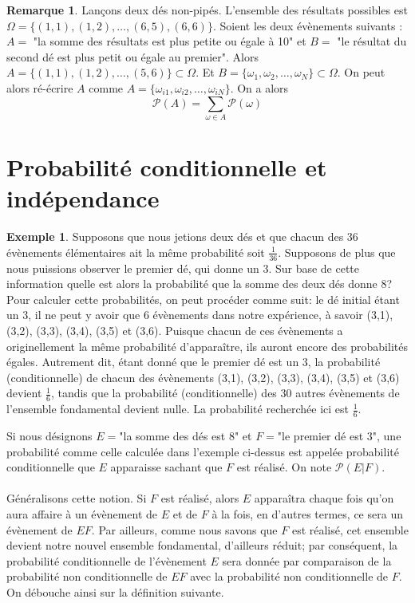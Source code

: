 \documentclass[a4paper,12pt]{report}
\theoremstyle{definition}
\renewcommand{\(}{\left(}
\renewcommand{\)}{\right)}
\renewcommand{\P}{\mathcal{P}}
\newtheorem{rmk}[thm]{Remarque}
\newtheorem{exmp}[thm]{Exemple}
\begin{document}
    
        \begin{rmk}
            Lançons deux dés non-pipés. L'ensemble des résultats possibles est \\
            $\Omega = \{(1,1),(1,2),\dots,(6,5),(6,6)\}$. Soient les deux évènements suivants : $A =$ "la somme des résultats est plus petite ou égale à 10" et $B =$ "le résultat du second dé est plus petit ou égale au premier". Alors $A = \{(1,1),(1,2),\dots,(5,6)\} \subset \Omega$. Et $B=\{\omega_1,\omega_2,\dots,\omega_N\}\subset\Omega$. On peut alors ré-écrire $A$ comme $A=\{ \omega_{i1},\omega_{i2},\dots,\omega_{iN} \}$. On a alors 
            $$\P(A) = \sum_{\omega \in A}\P(\omega)$$
        \end{rmk}
    
    \section{Probabilité conditionnelle et indépendance}
    
    \begin{exmp}
        Supposons que nous jetions deux dés et que chacun des 36 évènements élémentaires ait la même probabilité soit $\frac{1}{36}$. Supposons de plus que nous puissions observer le premier dé, qui donne un 3. Sur base de cette information quelle est alors la probabilité que la somme des deux dés donne 8? Pour calculer cette probabilités, on peut procéder comme suit: le dé initial étant un 3, il ne peut y avoir que 6 évènements dans notre expérience, à savoir (3,1), (3,2), (3,3), (3,4), (3,5) et (3,6). Puisque chacun de ces évènements a originellement la même probabilité d'apparaître, ils auront encore des probabilités égales. Autrement dit, étant donné que le premier dé est un 3, la probabilité (conditionnelle) de chacun des évènements (3,1), (3,2), (3,3), (3,4), (3,5) et (3,6) devient $\frac{1}{6}$, tandis que la probabilité (conditionnelle) des 30 autres évènements de l'ensemble fondamental devient nulle. La probabilité recherchée ici est $\frac{1}{6}$.
    \end{exmp}
    Si nous désignons $E=$"la somme des dés est 8" et $F= $"le premier dé est 3", une probabilité comme celle calculée dans l'exemple ci-dessus est appelée probabilité conditionnelle que $E$ apparaisse sachant que $F$ est réalisé. On note $\P(E|F).$\\\\
    Généralisons cette notion. Si $F$ est réalisé, alors $E$ apparaîtra chaque fois qu'on aura affaire à un évènement de $E$ et de $F$ à la fois, en d'autres termes, ce sera un évènement de $EF$. Par ailleurs, comme nous savons que $F$ est réalisé, cet ensemble devient notre nouvel ensemble fondamental, d'ailleurs réduit; par conséquent, la probabilité conditionnelle de l'évènement $E$ sera donnée par comparaison de la probabilité non conditionnelle de $EF$ avec la probabilité non conditionnelle de $F$. On débouche ainsi sur la définition suivante.\\
    
\end{document}
